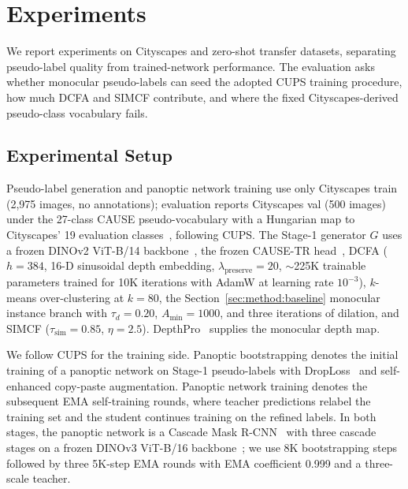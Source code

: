 \documentclass[10pt,twocolumn,letterpaper]{article}
\begin{document}
\section{Experiments}
\label{sec:experiments}

We report experiments on Cityscapes and zero-shot transfer datasets, separating pseudo-label quality from trained-network performance. The evaluation asks whether monocular pseudo-labels can seed the adopted CUPS training procedure, how much DCFA and SIMCF contribute, and where the fixed Cityscapes-derived pseudo-class vocabulary fails.

\subsection{Experimental Setup}
\label{sec:exp:setup}

Pseudo-label generation and panoptic network training use only Cityscapes train~\cite{cordts2016cityscapes} (2,975 images, no annotations); evaluation reports Cityscapes val (500 images) under the 27-class CAUSE pseudo-vocabulary with a Hungarian map to Cityscapes' 19 evaluation classes~\cite{kirillov2019panoptic}, following CUPS. The Stage-1 generator $G$ uses a frozen DINOv2 ViT-B/14 backbone~\cite{oquab2024dinov2}, the frozen CAUSE-TR head~\cite{kim2024cause}, DCFA ($h = 384$, 16-D sinusoidal depth embedding, $\lambda_\text{preserve} = 20$, $\sim$225K trainable parameters trained for 10K iterations with AdamW at learning rate $10^{-3}$), $k$-means over-clustering at $k = 80$, the Section~\ref{sec:method:baseline} monocular instance branch with $\tau_d = 0.20$, $A_\text{min} = 1000$, and three iterations of dilation, and SIMCF ($\tau_\text{sim} = 0.85$, $\eta = 2.5$). DepthPro~\cite{bochkovskii2024depthpro} supplies the monocular depth map.

We follow CUPS for the training side. Panoptic bootstrapping denotes the initial training of a panoptic network on Stage-1 pseudo-labels with DropLoss~\cite{wang2023cutler} and self-enhanced copy-paste augmentation. Panoptic network training denotes the subsequent EMA self-training rounds, where teacher predictions relabel the training set and the student continues training on the refined labels. In both stages, the panoptic network is a Cascade Mask R-CNN~\cite{cai2018cascade} with three cascade stages on a frozen DINOv3 ViT-B/16 backbone~\cite{simeoni2025dinov3}; we use 8K bootstrapping steps followed by three 5K-step EMA rounds with EMA coefficient 0.999 and a three-scale teacher.
\end{document}
